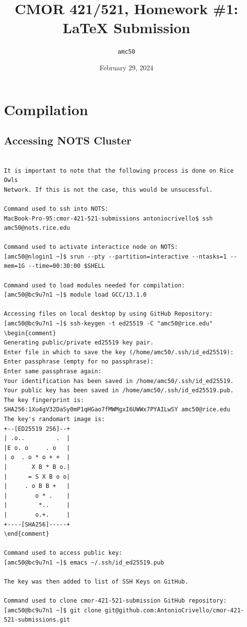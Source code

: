 \documentclass{article}
\title{CMOR 421/521, Homework \#1: \LaTeX{} Submission}
\author{\texttt{amc50}}
\date{February 29, 2024}
\begin{document}
\maketitle

\section{Compilation}

\subsection{Accessing NOTS Cluster}
\begin{verbatim}

It is important to note that the following process is done on Rice Owls
Network. If this is not the case, this would be unsucessful. 

Command used to ssh into NOTS:
MacBook-Pro-95:cmor-421-521-submissions antoniocrivello$ ssh amc50@nots.rice.edu

Command used to activate interactice node on NOTS:
[amc50@nlogin1 ~]$ srun --pty --partition=interactive --ntasks=1 --mem=1G --time=00:30:00 $SHELL

Command used to load modules needed for compilation:
[amc50@bc9u7n1 ~]$ module load GCC/13.1.0         

Accessing files on local desktop by using GitHub Repository:
[amc50@bc9u7n1 ~]$ ssh-keygen -t ed25519 -C "amc50@rice.edu"
\begin{comment}
Generating public/private ed25519 key pair.
Enter file in which to save the key (/home/amc50/.ssh/id_ed25519): 
Enter passphrase (empty for no passphrase): 
Enter same passphrase again: 
Your identification has been saved in /home/amc50/.ssh/id_ed25519.
Your public key has been saved in /home/amc50/.ssh/id_ed25519.pub.
The key fingerprint is:
SHA256:1Xu4gV32DaSy0mP1qHGao7fMWMgxI6UWWx7PYAILwSY amc50@rice.edu
The key's randomart image is:
+--[ED25519 256]--+
| .o..         .  |
|E o. o     . o   |
| o  . o * o + +  |
|       X B * B o.|
|      = S X B o o|
|     . o B B +   |
|        o * .    |
|         *..     |
|        o.+.     |
+----[SHA256]-----+
\end{comment}

Command used to access public key:
[amc50@bc9u7n1 ~]$ emacs ~/.ssh/id_ed25519.pub 

The key was then added to list of SSH Keys on GitHub.

Command used to clone cmor-421-521-submission GitHub repository:
[amc50@bc9u7n1 ~]$ git clone git@github.com:AntonioCrivello/cmor-421-521-submissions.git


\end{verbatim}
\end{document}
